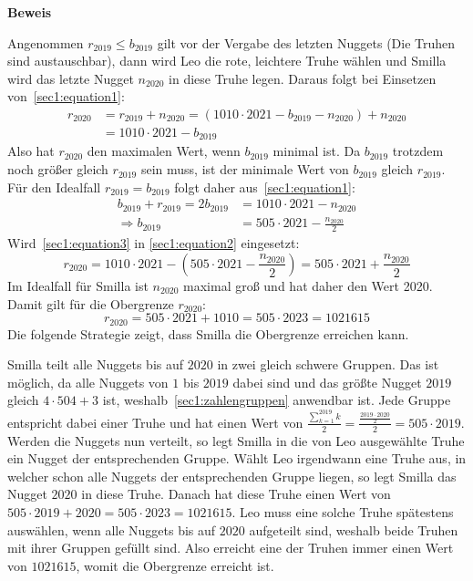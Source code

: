 \documentclass[10pt, a4paper, reqno]{amsart}
\makeatletter
\renewcommand\proofname{Beweis}
\renewenvironment{proof}[1][\proofname]{\par
\pushQED{\qed}%
\normalfont \topsep6\p@\@plus6\p@\relax
\trivlist
\item\relax
{\bfseries#1}\hspace\labelsep\ignorespaces
}{%
\popQED\endtrivlist\@endpefalse
}
\makeatother
\begin{document}
\begin{proof}
  Angenommen $r_{2019}\leq b_{2019}$ gilt vor der Vergabe des letzten Nuggets (Die Truhen sind
  austauschbar), dann wird Leo die rote, leichtere Truhe wählen und Smilla wird das letzte
  Nugget $n_{2020}$ in diese Truhe legen. Daraus folgt bei Einsetzen von~\eqref{sec1:equation1}:
  \begin{equation}\label{sec1:equation2}
    \begin{split}
      r_{2020}&=r_{2019}+n_{2020}=(1010\cdot2021-b_{2019}-n_{2020})+n_{2020}\\
       &= 1010\cdot2021-b_{2019}
    \end{split}
  \end{equation}
  Also hat $r_{2020}$ den maximalen Wert, wenn $b_{2019}$ minimal ist. Da
  $b_{2019}$ trotzdem noch größer gleich $r_{2019}$ sein muss, ist der minimale Wert von
  $b_{2019}$ gleich $r_{2019}$. Für den Idealfall $r_{2019}=b_{2019}$ folgt
  daher aus~\eqref{sec1:equation1}:
  \begin{equation}\label{sec1:equation3}
    \begin{split}
      b_{2019} + r_{2019}= 2b_{2019} &=1010\cdot2021-n_{2020}\\
      \Rightarrow b_{2019} &=505\cdot2021-\frac{n_{2020}}{2}
    \end{split}
  \end{equation}
  Wird~\eqref{sec1:equation3} in \eqref{sec1:equation2} eingesetzt:
  \begin{equation*}
    r_{2020}= 1010\cdot2021 -(505\cdot2021 - \frac{n_{2020}}{2})=505\cdot2021+\frac{n_{2020}}{2}
  \end{equation*}
  Im Idealfall für Smilla ist $n_{2020}$ maximal groß und hat daher den Wert
  2020. Damit gilt für die Obergrenze $r_{2020}$:
  \begin{equation*}
    r_{2020}=505\cdot2021+1010 = 505\cdot2023 = 1021615
  \end{equation*}
  Die folgende Strategie zeigt, dass Smilla die Obergrenze erreichen kann.

  Smilla teilt alle Nuggets bis auf $2020$ in zwei gleich schwere Gruppen. Das
  ist möglich, da alle Nuggets von $1$ bis $2019$ dabei sind und das größte
  Nugget $2019$ gleich $4\cdot504+3$ ist, weshalb~\autoref{sec1:zahlengruppen}
  anwendbar ist. Jede Gruppe entspricht dabei einer Truhe und hat einen Wert von
  $\frac{\sum^{2019}_{k=1}k}{2} = \frac{\frac{2019\cdot2020}{2}}{2} =
  505\cdot2019$. Werden die Nuggets nun verteilt, so legt Smilla in die von Leo
  ausgewählte Truhe ein Nugget der entsprechenden Gruppe. Wählt Leo irgendwann eine Truhe aus, in
  welcher schon alle Nuggets der entsprechenden Gruppe liegen, so legt Smilla das
  Nugget $2020$ in diese Truhe. Danach hat diese Truhe einen Wert von
  $505\cdot2019 + 2020 = 505\cdot2023 = 1021615$. Leo muss eine solche Truhe spätestens auswählen,
  wenn alle Nuggets bis auf $2020$ aufgeteilt sind, weshalb beide Truhen mit
  ihrer Gruppen gefüllt sind. Also erreicht eine der Truhen immer einen Wert von
  $1021615$, womit die Obergrenze erreicht ist.
\end{proof}
\end{document}
